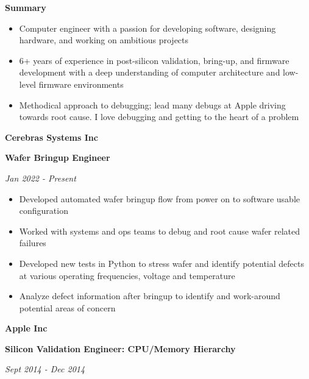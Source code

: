 \documentclass{article}
\newenvironment{name}{\fontfamily{phv}\selectfont\bfseries\normalsize}{\par}
\newenvironment{colorheading}{\fontfamily{phv}\selectfont\bfseries\normalsize\color{darkcyan}}{\par}
\newenvironment{metadata}{\fontfamily{phv}\selectfont\itshape\footnotesize\color{darkgray}}{\par}
\newenvironment{itemizedbody}{\fontfamily{phv}\selectfont\footnotesize\raggedright\begin{itemize}}{\end{itemize}\par}
\newenvironment{experience}[2]%
{%
  \begin{minipage}{0.71\linewidth}\raggedright#1\end{minipage}%
  \hfill%
  \begin{minipage}{0.28\linewidth}\raggedleft#2\end{minipage}%
}%
{\par}
\newcommand{\lineitem}{\item[{$\star$}]}
\newcommand{\dotsep}{\smallskip\begin{centering}\begin{colorheading}{\large$\bullet$}\end{colorheading}\end{centering}\smallskip}
\begin{document}
  \hfill
  \begin{minipage}[t]{0.67\linewidth}
    \begin{experience}
    {
      \begin{name}Summary\end{name}
    }{}
    \end{experience}
    \begin{itemizedbody}
      \lineitem Computer engineer with a passion for developing software, designing hardware, and working on ambitious projects
      \lineitem 6+ years of experience in post-silicon validation, bring-up, and firmware development with a deep understanding
                of computer architecture and low-level firmware environments
      \lineitem Methodical approach to debugging; lead many debugs at Apple driving towards root cause. I love debugging and
                getting to the heart of a problem
    \end{itemizedbody}
    \dotsep
    \begin{experience}
    {
      \begin{name}Cerebras Systems Inc\end{name}
      \begin{colorheading}Wafer Bringup Engineer\end{colorheading}
    }
    {
      \begin{metadata}Jan 2022 - Present\end{metadata}
    }
    \end{experience}
    \begin{itemizedbody}
      \lineitem Developed automated wafer bringup flow from power on to software usable configuration
      \lineitem Worked with systems and ops teams to debug and root cause wafer related failures
      \lineitem Developed new tests in Python to stress wafer and identify potential defects at various operating frequencies, voltage and temperature
      \lineitem Analyze defect information after bringup to identify and work-around potential areas of concern
    \end{itemizedbody}
    \smallskip
    \begin{experience}
    {
      \begin{name}Apple Inc\end{name}
      \begin{colorheading}Silicon Validation Engineer: CPU/Memory Hierarchy\end{colorheading}
    }
    {
      \begin{metadata}Sept 2014 - Dec 2014\end{metadata}
}
\end{experience}
\end{minipage}
\end{document}

